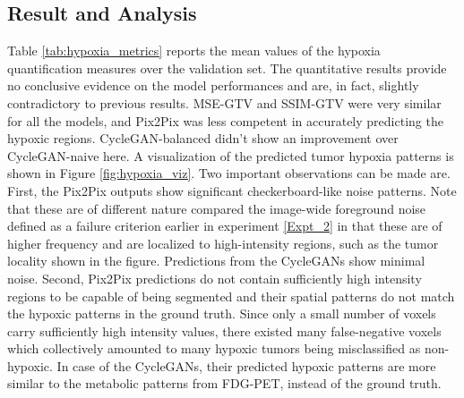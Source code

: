 \subsection{Result and Analysis}
Table \ref{tab:hypoxia_metrics} reports the mean values of the hypoxia quantification measures over the validation set. The quantitative results provide no conclusive evidence on the model performances and are, in fact, slightly contradictory to previous results. MSE-GTV and SSIM-GTV were very similar for all the models, and Pix2Pix was less competent in accurately predicting the hypoxic regions. CycleGAN-balanced didn't show an improvement over CycleGAN-naive here. A visualization of the predicted tumor hypoxia patterns is shown in Figure \ref{fig:hypoxia_viz}. Two important observations can be made are. First, the Pix2Pix outputs show significant checkerboard-like noise patterns. Note that these are of different nature compared the image-wide foreground noise defined as a failure criterion earlier in experiment \ref{Expt_2} in that these are of higher frequency and are localized to high-intensity regions, such as the tumor locality shown in the figure. Predictions from the CycleGANs show minimal noise. Second, Pix2Pix predictions do not contain sufficiently high intensity regions to be capable of being segmented and their spatial patterns do not match the hypoxic patterns in the ground truth. Since only a small number of voxels carry sufficiently high intensity values, there existed many false-negative voxels which collectively amounted to many hypoxic tumors being misclassified as non-hypoxic. In case of the CycleGANs, their predicted hypoxic patterns are more similar to the metabolic patterns from FDG-PET, instead of the ground truth.


